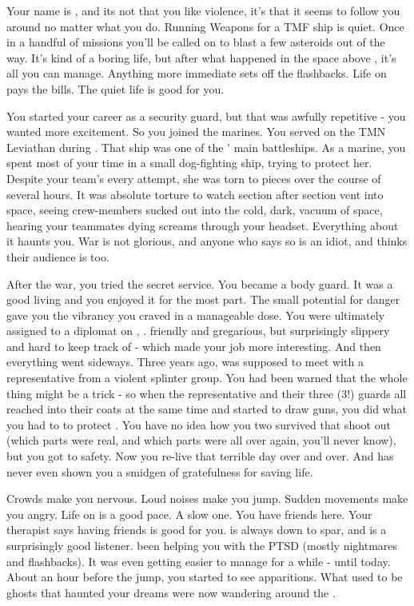 \documentclass[char]{TMFHope}
\begin{document}
\name{\cWeap{}}

Your name is \cWeap{\full}, and its not that you like violence, it's that it seems to follow you around no matter what you do. Running Weapons for a TMF ship is quiet. Once in a handful of missions you'll be called on to blast a few asteroids out of the way. It's kind of a boring life, but after what happened in the space above \pHome{}, it's all you can manage. Anything more immediate sets off the flashbacks. Life on \pNew{} pays the bills. The quiet life is good for you.

You started your career as a security guard, but that was awfully repetitive - you wanted more excitement. So you joined the marines. You served on the TMN Leviathan during \pBattle{}. That ship was one of the \pPlan{}' main battleships. As a marine, you spent most of your time in a small dog-fighting ship, trying to protect her. Despite your team's every attempt, she was torn to pieces over the course of several hours. It was absolute torture to watch section after section vent into space, seeing crew-members sucked out into the cold, dark, vacuum of space, hearing your teammates dying screams through your headset. Everything about it haunts you. War is not glorious, and anyone who says so is an idiot, and thinks their audience is too.

After the war, you tried the \pPlan{} secret service. You became a body guard. It was a good living and you enjoyed it for the most part. The small potential for danger gave you the vibrancy you craved in a manageable dose. You were ultimately assigned to a diplomat on \pHome{}, \cDip{\full}. \cDip{\They} \cDip{\were} friendly and gregarious, but surprisingly slippery and hard to keep track of - which made your job more interesting. And then everything went sideways. Three years ago, \cDip{} was supposed to meet with a representative from a violent splinter group. You had been warned that the whole thing might be a trick - so when the representative and their three (3!) guards all reached into their coats at the same time and started to draw guns, you did what you had to to protect \cDip{}. You have no idea how you two survived that shoot out (which parts were real, and which parts were \pBattle{} all over again, you'll never know), but you got \cDip{\them} to safety. Now you re-live that terrible day over and over. And \cDip{} has never even shown you a smidgen of gratefulness for saving \cDip{\their} life.

Crowds make you nervous. Loud noises make you jump. Sudden movements make you angry. Life on \pNew{} is a good pace. A slow one. You have friends here. Your therapist says having friends is good for you. \cSci{} is always down to spar, and \cNav{} is a surprisingly good listener. \cNav{\They} \cNav{\have} been helping you with the PTSD (mostly nightmares and flashbacks). It was even getting easier to manage for a while - until today. About an hour before the jump, you started to see apparitions. What used to be ghosts that haunted your dreams were now wandering around the \pNew{}.
\end{document}
